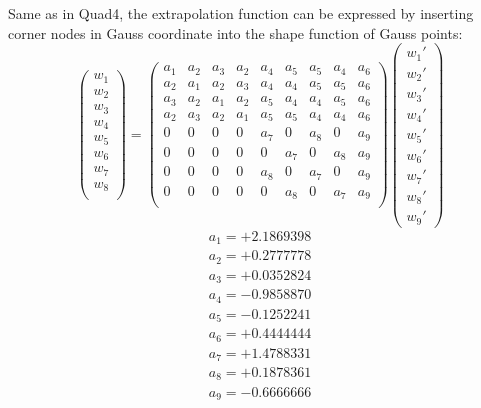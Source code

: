 Same as in Quad4, the extrapolation function can be expressed by inserting corner nodes in Gauss coordinate into the shape function of Gauss points:
\begin{equation}
\begin{pmatrix}
w_1 \\
w_2 \\
w_3 \\
w_4 \\
w_5 \\
w_6 \\
w_7 \\
w_8 \\
\end{pmatrix} = \begin{pmatrix}
a_1 & a_2 &  a_3 &  a_2 & a_4 & a_5 & a_5 & a_4 & a_6       \\[0.3em]
a_2 & a_1 &  a_2 &  a_3 & a_4 & a_4 & a_5 & a_5 & a_6       \\[0.3em]
a_3 & a_2 &  a_1 &  a_2 & a_5 & a_4 & a_4 & a_5 & a_6       \\[0.3em]
a_2 & a_3 &  a_2 &  a_1 & a_5 & a_5 & a_4 & a_4 & a_6       \\[0.3em]
0     & 0    &  0     &  0     & a_7 & 0     & a_8 & 0    & a_9       \\[0.3em]
0     & 0    &  0     &  0     & 0    & a_7 & 0      & a_8 & a_9       \\[0.3em]
0     & 0    &  0     &  0     & a_8 & 0    & a_7 & 0      & a_9       \\[0.3em]
0     & 0    &  0     &  0     & 0     & a_8 & 0 & a_7     & a_9       \\[0.3em]                    
\end{pmatrix} \begin{pmatrix}
{w_1}' \\
{w_2}' \\
{w_3}' \\
{w_4}' \\
{w_5}' \\
{w_6}' \\
{w_7}' \\
{w_8}' \\
{w_9}'
\end{pmatrix}
\end{equation}	
\begin{align*}
a_1 = +2.1869398 \\
a_2 = +0.2777778 \\
a_3 = +0.0352824 \\
a_4 = -0.9858870 \\
a_5 = -0.1252241 \\
a_6 = +0.4444444 \\
a_7 = +1.4788331 \\
a_8 = +0.1878361 \\
a_9 = -0.6666666
\end{align*}

